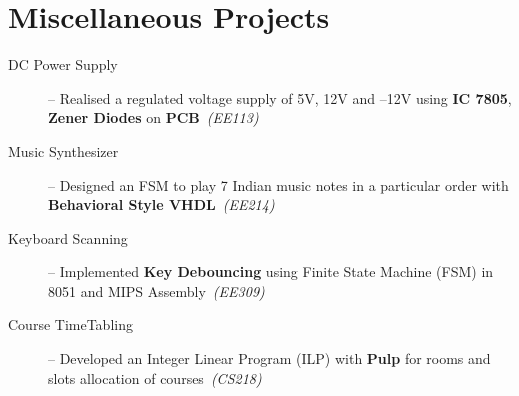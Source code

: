 \documentclass[10pt,a4paper,sans]{moderncv}        %
\newcommand{\rhsmalle}[1]{\hfill{\footnotesize{\textsl{(#1)}}}\\[-12pt]}
\begin{document}
\section{Miscellaneous Projects}
\vspace{0.2em}
\begin{description}
	\item[DC Power Supply] -- Realised a regulated voltage supply of 5V, 12V and --12V using \textbf{IC 7805}, \textbf{Zener Diodes} on \textbf{PCB}\ \rhsmalle{EE113}
	\item[Music Synthesizer] -- Designed an FSM to play 7 Indian music notes in a particular order with \textbf{Behavioral Style VHDL}\ \rhsmalle{EE214}%
	\item[Keyboard Scanning] -- Implemented \textbf{Key Debouncing} using Finite State Machine (FSM) in 8051 and MIPS Assembly\ \rhsmalle{EE309}
	\item[Course TimeTabling] -- Developed an Integer Linear Program (ILP) with \textbf{Pulp} for rooms and slots allocation of courses\ \rhsmalle{CS218}%

\end{description}
\end{document}
